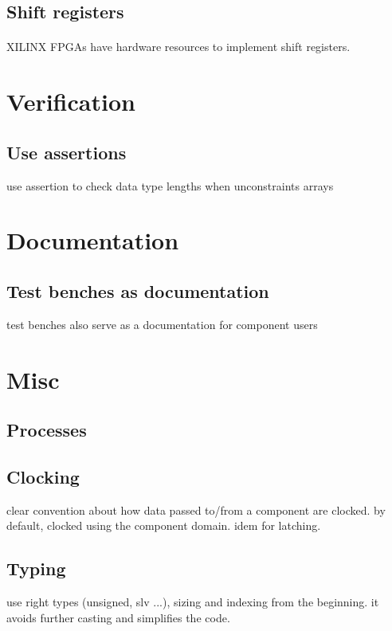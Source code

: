 \documentclass[12pt]{article}
\begin{document}
\subsection{Shift registers}
\paragraph{}
XILINX FPGAs have hardware resources to implement shift registers.



\newpage
\section{Verification}


\subsection{Use assertions}
use assertion to check data type lengths when unconstraints
arrays


\newpage
\section{Documentation}

\subsection{Test benches as documentation}
test benches also serve as a documentation for component users


\newpage
\section{Misc}
\subsection{Processes}


\subsection{Clocking}
clear convention about how data passed to/from a component are
clocked. by default, clocked using the component domain. idem for
latching.


\subsection{Typing}
use right types (unsigned, slv ...), sizing and indexing from the
beginning. it avoids further casting and simplifies the code.
\end{document}
